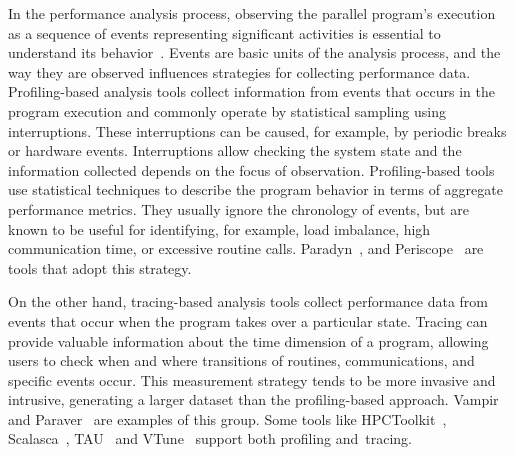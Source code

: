 In the performance analysis process, observing the parallel program's execution as a sequence of events representing significant activities is essential to understand its behavior~\cite{Pantazopoulos1997}. Events are basic units of the analysis process, and the way they are observed influences strategies for collecting performance data. Profiling-based analysis tools collect information from events that occurs in the program execution and commonly operate by statistical sampling using interruptions. These interruptions can be caused, for example, by periodic breaks or hardware events. Interruptions allow checking the system state and the information collected depends on the focus of observation. Profiling-based tools use statistical techniques to describe the program behavior in terms of aggregate performance metrics. They usually ignore the chronology of events, but are known to be useful for identifying, for example, load imbalance, high communication time, or excessive routine calls. Paradyn~\cite{Miller1995}, and Periscope~\cite{Gerndt2010} are tools that adopt this strategy.

On the other hand, tracing-based analysis tools collect performance data from events that occur when the program takes over a particular state. Tracing can provide valuable information about the time dimension of a program, allowing users to check when and where transitions of routines, communications, and specific events occur. This measurement strategy tends to be more invasive and intrusive, generating a larger dataset than the profiling-based approach. Vampir~\cite{Weber2019} and Paraver~\cite{Labarta2005} are examples of this group. Some tools like HPCToolkit~\cite{Adhianto2010}, Scalasca~\cite{Geimer2010}, TAU~\cite{Shende2006} and VTune~\cite{VTune} support both profiling and~tracing.

